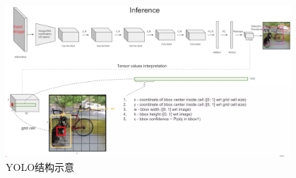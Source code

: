\begin{figure}[!t]
	\centering
	\includegraphics[width=0.95\textwidth]{./imgs/yolo.png}
	\caption{YOLO结构示意}
	\label{fig:yolo}
\end{figure}
